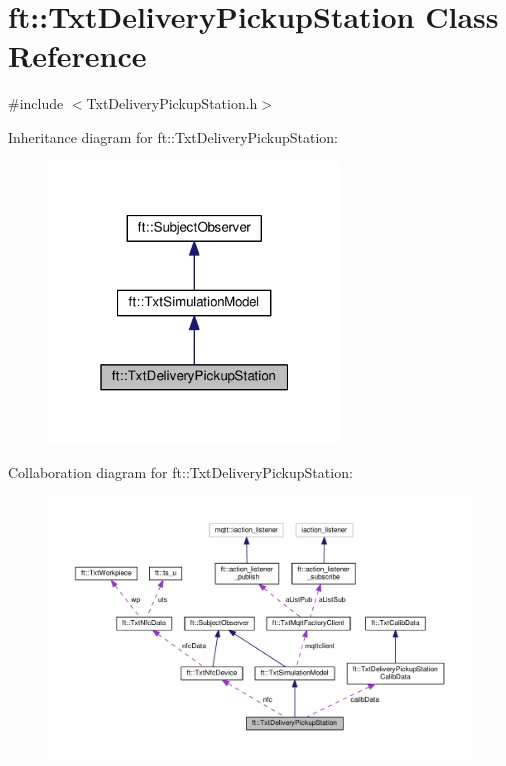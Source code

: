 \hypertarget{classft_1_1_txt_delivery_pickup_station}{}\section{ft\+:\+:Txt\+Delivery\+Pickup\+Station Class Reference}
\label{classft_1_1_txt_delivery_pickup_station}


{\ttfamily \#include $<$Txt\+Delivery\+Pickup\+Station.\+h$>$}



Inheritance diagram for ft\+:\+:Txt\+Delivery\+Pickup\+Station\+:
\nopagebreak
\begin{figure}[H]
\begin{center}
\leavevmode
\includegraphics[width=220pt]{classft_1_1_txt_delivery_pickup_station__inherit__graph}
\end{center}
\end{figure}


Collaboration diagram for ft\+:\+:Txt\+Delivery\+Pickup\+Station\+:
\nopagebreak
\begin{figure}[H]
\begin{center}
\leavevmode
\includegraphics[width=350pt]{classft_1_1_txt_delivery_pickup_station__coll__graph}
\end{center}
\end{figure}
